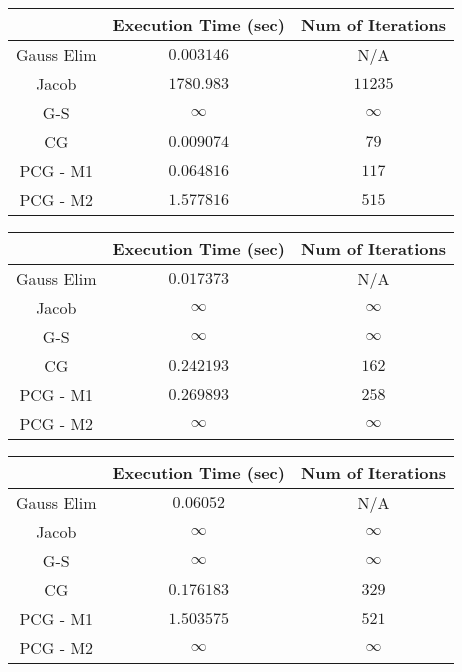 \documentclass[paper=a4, fontsize=11pt]{scrartcl} %
\numberwithin{equation}{section} %
\numberwithin{figure}{section} %
\numberwithin{table}{section} %
\begin{document}
\begin{center}
\begin{tabular} {| c | c | c |}
\hline
          & Execution Time (sec) & Num of Iterations\\ \hline
Gauss Elim& $0.003146$ & N/A\\ \hline
Jacob     & $1780.983$ & $11235$\\ \hline
G-S       & $ \infty $ & $\infty$\\ \hline
CG        & $0.009074$ & $79$\\ \hline
PCG - M1  & $0.064816$ & $117$\\ \hline
PCG - M2  & $1.577816$ & $515$\\
\hline
\end{tabular}
\end{center}

\begin{center}
\begin{tabular} {| c | c | c |}
\hline
          & Execution Time (sec) & Num of Iterations\\ \hline
Gauss Elim& $0.017373$ & N/A\\ \hline
Jacob     & $ \infty $ & $\infty$\\ \hline
G-S       & $ \infty $ & $\infty$\\ \hline
CG        & $0.242193$ & $162$\\ \hline
PCG - M1  & $0.269893$ & $258$\\ \hline
PCG - M2  & $ \infty $ & $\infty$\\
\hline
\end{tabular}
\end{center}

\begin{center}
\begin{tabular} {| c | c | c |}
\hline
          & Execution Time (sec) & Num of Iterations\\ \hline
Gauss Elim& $0.06052$ & N/A\\ \hline
Jacob     & $ \infty $ & $\infty$\\ \hline
G-S       & $ \infty $ & $\infty$\\ \hline
CG        & $0.176183$ & $329$\\ \hline
PCG - M1  & $1.503575$ & $521$\\ \hline
PCG - M2  & $ \infty $ & $\infty$\\
\hline
\end{tabular}
\end{center}
\end{document}
